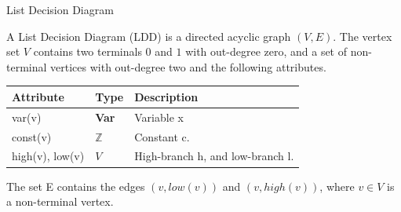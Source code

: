 \begin{frame}{List Decision Diagram}

\begin{mydef}
A List Decision Diagram (LDD) is a directed acyclic graph $(V,E)$. The vertex set $V$ contains two terminals $0$ and $1$ with out-degree zero, and a set of non-terminal vertices with out-degree two and the following attributes.
\begin{tabular}{lll}
Attribute                & Type                      & Description                                           \\\hline
var(v)                   & \textbf{Var}              & Variable x \\

const(v)                 & $\mathbb{Z}$              & Constant c.                                           \\
high(v), low(v)          & $V$                       & High-branch h, and low-branch l.                   
\end{tabular}
The set E contains the edges $(v,low(v))$ and $(v, high(v))$, where $v \in V$ is a non-terminal vertex.
\end{mydef} 

\end{frame}

